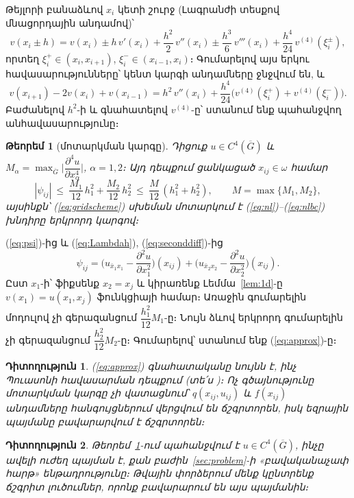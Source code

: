 \documentclass[12pt,a4paper]{article}
\makeatletter
\theoremstyle{arm}
\newtheorem{theorem}{Թեորեմ}
\theoremstyle{armdef}
\newtheorem{remark}{Դիտողություն}
\renewcommand{\proofname}{Ապացույց։}
\renewenvironment{proof}[1][\proofname]{\par\pushQED{\qed}\normalfont\topsep6\p@\@plus6\p@\relax
  \trivlist\item[\hskip\labelsep\bfseries #1]\ignorespaces}{\popQED\endtrivlist\@endpefalse}
\numberwithin{equation}{section}
\newcommand{\G}{\overline{G}}
\makeatother
\begin{document}
\begin{proof}
Թեյլորի բանաձևով $x_i$ կետի շուրջ (Լագրանժի տեսքով մնացորդային անդամով)՝
\[v(x_i\pm h)=v(x_i)\pm h\,v'(x_i)+\frac{h^2}{2}\,v''(x_i)\pm\frac{h^3}{6}\,v'''(x_i)+\frac{h^4}{24}\,v^{(4)}(\xi_i^{\pm}),\]
որտեղ $\xi_i^{+}\in(x_i,x_{i+1})$, $\xi_i^{-}\in(x_{i-1},x_i)$։ Գումարելով այս երկու հավասարությունները՝ կենտ կարգի անդամները ջնջվում են, և
\[v(x_{i+1})-2v(x_i)+v(x_{i-1})=h^2\,v''(x_i)+\frac{h^4}{24}\Big(v^{(4)}(\xi_i^{+})+v^{(4)}(\xi_i^{-})\Big).\]
Բաժանելով $h^2$-ի և գնահատելով $v^{(4)}$-ը՝ ստանում ենք պահանջվող անհավասարությունը։
\end{proof}

\begin{theorem}[մոտարկման կարգը]\label{thm:approx}
Դիցուք $u\in C^4(\G)$ և $M_\alpha=\max_{\G}\Big|\dfrac{\partial^4u}{\partial x_\alpha^4}\Big|$, $\alpha=1,2$։ Այդ դեպքում ցանկացած $x_{ij}\in\omega$ համար
\begin{equation}\label{eq:approx}
|\psi_{ij}|\ \le\ \frac{M_1}{12}\,h_1^2+\frac{M_2}{12}\,h_2^2\ \le\ \frac{M}{12}\,(h_1^2+h_2^2),\qquad M=\max\{M_1,M_2\},
\end{equation}
այսինքն՝ (\ref{eq:gridscheme}) սխեման մոտարկում է (\ref{eq:nl})--(\ref{eq:nlbc}) խնդիրը երկրորդ կարգով։
\end{theorem}

\begin{proof}
(\ref{eq:psi})-ից և (\ref{eq:Lambdah}), (\ref{eq:seconddiff})-ից
\[\psi_{ij}=\Big(u_{\bar x_1x_1}-\frac{\partial^2u}{\partial x_1^2}\Big)(x_{ij})+\Big(u_{\bar x_2x_2}-\frac{\partial^2u}{\partial x_2^2}\Big)(x_{ij}).\]
Ըստ $x_1$-ի՝ ֆիքսենք $x_2=x_j$ և կիրառենք Լեմմա~\ref{lem:1d}-ը $v(x_1)=u(x_1,x_j)$ ֆունկցիայի համար։ Առաջին գումարելին մոդուլով չի գերազանցում $\dfrac{h_1^2}{12}M_1$-ը։ Նույն ձևով երկրորդ գումարելին չի գերազանցում $\dfrac{h_2^2}{12}M_2$-ը։ Գումարելով՝ ստանում ենք (\ref{eq:approx})-ը։
\end{proof}

\begin{remark}
(\ref{eq:approx}) գնահատականը նույնն է, ինչ Պուասոնի հավասարման դեպքում (տե՛ս \cite[էջ~546]{bakh})։ Ոչ գծայնությունը մոտարկման կարգը չի վատացնում՝ $q(x_{ij},u_{ij})$ և $f(x_{ij})$ անդամները հանգույցներում վերցվում են ճշգրտորեն, իսկ եզրային պայմանը բավարարվում է ճշգրտորեն։
\end{remark}

\begin{remark}
Թեորեմ~\ref{thm:approx}-ում պահանջվում է $u\in C^4(\G)$, ինչը ավելի ուժեղ պայման է, քան բաժին~\ref{sec:problem}-ի «բավականաչափ հարթ» ենթադրությունը։ Թվային փորձերում մենք կընտրենք ճշգրիտ լուծումներ, որոնք բավարարում են այս պայմանին։
\end{remark}
\end{document}
